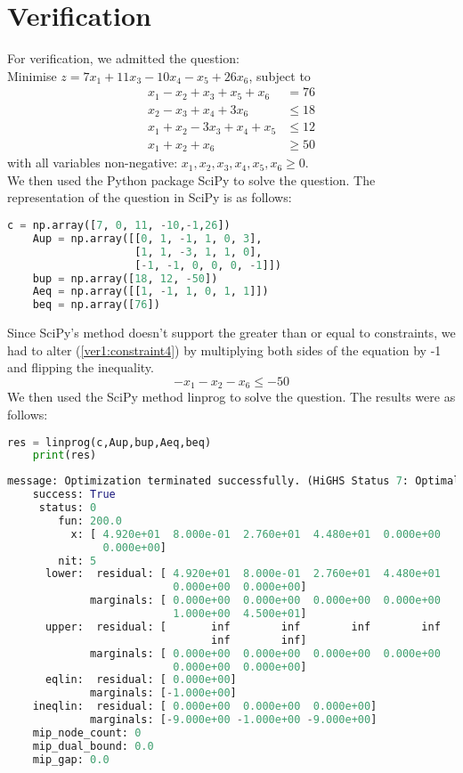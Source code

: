 \documentclass{article}
\numberwithin{equation}{section}
\begin{document}
\section{Verification}
For verification, we admitted the question: \\
Minimise $z = 7x_1 + 11x_3 - 10x_4 - x_5 + 26x_6$, subject to
\begin{align}
    x_1 - x_2 + x_3 + x_5 + x_6 &= 76 \label{ver1:constraint1} \\
    x_2 - x_3 + x_4 + 3x_6 &\leq 18 \label{ver1:constraint2} \\
    x_1 + x_2 - 3x_3 + x_4 + x_5 &\leq 12 \label{ver1:constraint3} \\
    x_1 + x_2 + x_6 &\geq 50 \label{ver1:constraint4}
\end{align}
with all variables non-negative: $x_1, x_2, x_3, x_4, x_5, x_6 \geq 0$. \\
We then used the Python package SciPy to solve the question. The representation of the question in SciPy is as follows:
\begin{lstlisting}[language=Python, basicstyle=\scriptsize, frame=single]
    c = np.array([7, 0, 11, -10,-1,26])
    Aup = np.array([[0, 1, -1, 1, 0, 3],
                    [1, 1, -3, 1, 1, 0],
                    [-1, -1, 0, 0, 0, -1]])
    bup = np.array([18, 12, -50])
    Aeq = np.array([[1, -1, 1, 0, 1, 1]])
    beq = np.array([76])
\end{lstlisting}
Since SciPy's method doesn't support the greater than or equal to constraints, we had to alter (\ref{ver1:constraint4}) by multiplying both sides of the equation by -1 and flipping the inequality. 
\begin{equation}
    -x_1 - x_2 - x_6 \leq -50
\end{equation}
We then used the SciPy method linprog to solve the question. The results were as follows:
\begin{lstlisting}[language=Python, basicstyle=\scriptsize, frame=single]
    res = linprog(c,Aup,bup,Aeq,beq)
    print(res)
\end{lstlisting}
\begin{lstlisting}[language=Python, basicstyle=\scriptsize]
    message: Optimization terminated successfully. (HiGHS Status 7: Optimal)
    success: True
     status: 0
        fun: 200.0
          x: [ 4.920e+01  8.000e-01  2.760e+01  4.480e+01  0.000e+00
               0.000e+00]
        nit: 5
      lower:  residual: [ 4.920e+01  8.000e-01  2.760e+01  4.480e+01
                          0.000e+00  0.000e+00]
             marginals: [ 0.000e+00  0.000e+00  0.000e+00  0.000e+00
                          1.000e+00  4.500e+01]
      upper:  residual: [       inf        inf        inf        inf
                                inf        inf]
             marginals: [ 0.000e+00  0.000e+00  0.000e+00  0.000e+00
                          0.000e+00  0.000e+00]
      eqlin:  residual: [ 0.000e+00]
             marginals: [-1.000e+00]
    ineqlin:  residual: [ 0.000e+00  0.000e+00  0.000e+00]
             marginals: [-9.000e+00 -1.000e+00 -9.000e+00]
    mip_node_count: 0
    mip_dual_bound: 0.0
    mip_gap: 0.0
\end{lstlisting}
\end{document}
